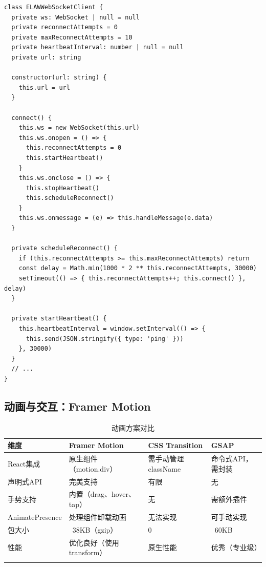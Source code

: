 \documentclass[fontset=mac,a4paper,11pt]{ctexart}
\begin{document}
\begin{lstlisting}[caption=WebSocket客户端封装示例]
class ELAWWebSocketClient {
  private ws: WebSocket | null = null
  private reconnectAttempts = 0
  private maxReconnectAttempts = 10
  private heartbeatInterval: number | null = null
  private url: string

  constructor(url: string) {
    this.url = url
  }

  connect() {
    this.ws = new WebSocket(this.url)
    this.ws.onopen = () => {
      this.reconnectAttempts = 0
      this.startHeartbeat()
    }
    this.ws.onclose = () => {
      this.stopHeartbeat()
      this.scheduleReconnect()
    }
    this.ws.onmessage = (e) => this.handleMessage(e.data)
  }

  private scheduleReconnect() {
    if (this.reconnectAttempts >= this.maxReconnectAttempts) return
    const delay = Math.min(1000 * 2 ** this.reconnectAttempts, 30000)
    setTimeout(() => { this.reconnectAttempts++; this.connect() }, delay)
  }

  private startHeartbeat() {
    this.heartbeatInterval = window.setInterval(() => {
      this.send(JSON.stringify({ type: 'ping' }))
    }, 30000)
  }
  // ...
}
\end{lstlisting}

\subsection{动画与交互：Framer Motion}

\begin{table}[H]
\centering
\caption{动画方案对比}
\label{tab:animation}
\begin{tabular}{L{2.5cm}L{3.5cm}L{3.5cm}L{3.5cm}}
\toprule
\textbf{维度} & \textbf{Framer Motion} & \textbf{CSS Transition} & \textbf{GSAP} \\
\midrule
{}
React集成 & 原生组件（motion.div） & 需手动管理className & 命令式API，需封装 \\
声明式API & 完美支持 & 有限 & 无 \\
手势支持 & 内置（drag、hover、tap） & 无 & 需额外插件 \\
AnimatePresence & 处理组件卸载动画 & 无法实现 & 可手动实现 \\
包大小 & ~38KB（gzip） & 0 & ~60KB \\
性能 & 优化良好（使用transform） & 原生性能 & 优秀（专业级） \\
\bottomrule
\end{tabular}
\end{table}
\end{document}
